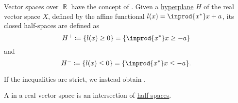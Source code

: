 \begin{definition}\label{def:half_space}
  Vector spaces over \( \BbbR \) have the concept of . Given a \hyperref[def:hyperplane]{hyperplane} \( H \) of the real vector space \( X \), defined by the affine functional \( l(x) = \inprod {x^*} x + a \), its closed half-spaces are defined as
  \begin{equation*}
    H^+ \coloneqq \{ l(x) \geq 0 \} = \{ \inprod {x^*} x \geq -a \}
  \end{equation*}
  and
  \begin{equation*}
    H^- \coloneqq \{ l(x) \leq 0 \} = \{ \inprod {x^*} x \leq -a \}.
  \end{equation*}

  If the inequalities are strict, we instead obtain .
\end{definition}

\begin{definition}\label{def:polyhedron}
  A  in a real vector space is an intersection of \hyperref[def:half_space]{half-spaces}.
\end{definition}

